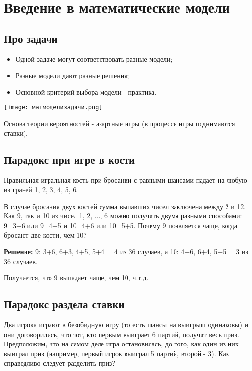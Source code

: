 \documentclass[../Main.tex]{subfiles}
\begin{document}
\chapter*{Введение в математические модели}
\section{Про задачи}
\begin{itemize}
    \item Одной задаче могут соответствовать разные модели;
    \item Разные модели дают разные решения;
    \item Основной критерий выбора модели - практика.
\end{itemize}

\begin{center}
    \texttt{[image: матмоделизадачи.png]}
\end{center}

Основа теории вероятностей - азартные игры (в процессе игры поднимаются ставки).

\section{Парадокс при игре в кости}

Правильная игральная кость при бросании с равными шансами падает на любую из граней 1, 2, 3, 4, 5, 6. 

В случае бросания двух костей сумма выпавших чисел заключена между 2 и 12. 
Как 9, так и 10 из чисел 1, 2, ..., 6 можно получить двумя разными способами: 9=3+6 или 9=4+5 и 10=4+6 или 10=5+5. 
Почему 9 появляется чаще, когда бросают две кости, чем 10?

\textbf{Решение:} 9: 3+6, 6+3, 4+5, 5+4 = 4 из 36 случаев, а 10: 4+6, 6+4, 5+5 = 3 из 36 случаев.

Получается, что 9 выпадает чаще, чем 10, ч.т.д.

\section{Парадокс раздела ставки}

Два игрока играют в безобидную игру (то есть шансы на выигрыш одинаковы) и они договорились, что тот, кто первым выиграет 6 партий, получит весь приз. Предположим, что на самом деле игра остановилась, до того, как один из них выиграл приз (например, первый игрок выиграл 5 партий, второй - 3). Как справедливо следует разделить приз?
\end{document}
